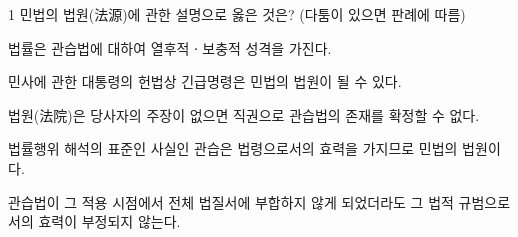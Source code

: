 \begin{question}{1}
민법의 법원(法源)에 관한 설명으로 옳은 것은? (다툼이 있으면 판례에 따름)
\begin{choices}
  \item 법률은 관습법에 대하여 열후적ㆍ보충적 성격을 가진다.
  \item 민사에 관한 대통령의 헌법상 긴급명령은 민법의 법원이 될 수 있다.
  \item 법원(法院)은 당사자의 주장이 없으면 직권으로 관습법의 존재를 확정할 수 없다.
  \item 법률행위 해석의 표준인 사실인 관습은 법령으로서의 효력을 가지므로 민법의 법원이다.
  \item 관습법이 그 적용 시점에서 전체 법질서에 부합하지 않게 되었더라도 그 법적 규범으로서의 효력이 부정되지 않는다.
\end{choices}
\end{question}
